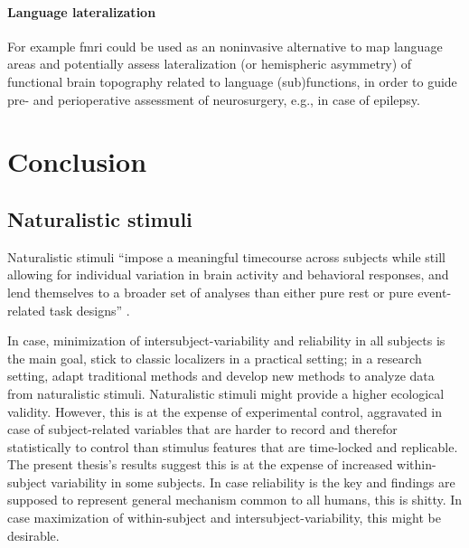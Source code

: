 \paragraph{Language lateralization}



%
For example \ac{fmri} could be used as an noninvasive alternative to map
language areas and potentially assess lateralization (or hemispheric asymmetry)
of functional brain topography related to language (sub)functions, in order to
guide pre- and perioperative assessment of neurosurgery, e.g., in case of
epilepsy.



\section{Conclusion}

\subsection{Naturalistic stimuli}

%
Naturalistic stimuli ``impose a meaningful timecourse across subjects while
still allowing for individual variation in brain activity and behavioral
responses, and lend themselves to a broader set of analyses than either pure
rest or pure event-related task designs'' \citep[][p. 142]{finn2017can}.

%
In case, minimization of intersubject-variability and reliability in all
subjects is the main goal, stick to classic localizers in a practical setting;
in a research setting, adapt traditional methods and develop new methods to
analyze data from naturalistic stimuli.
%
Naturalistic stimuli might provide a higher ecological validity.
%
However, this is at the expense of experimental control, aggravated in case of
subject-related variables that are harder to record and therefor statistically
to control than stimulus features that are time-locked and replicable.
%
The present thesis's results suggest this is at the expense of increased
within-subject variability in some subjects.
%
In case reliability is the key and findings are supposed to represent general
mechanism common to all humans, this is shitty.
%
In case maximization of within-subject and intersubject-variability, this might
be desirable.

